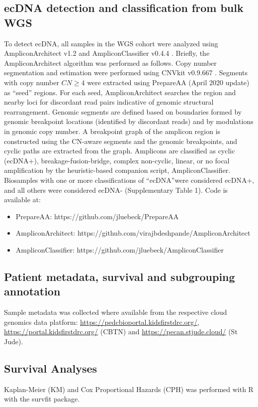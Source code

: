 \subsection{ecDNA detection and classification from bulk WGS}
\label{4-classification}
To detect ecDNA, all samples in the WGS cohort were analyzed using AmpliconArchitect v1.2 \cite{AA} and AmpliconClassifier v0.4.4 \cite{Kim_2020}. Briefly, the AmpliconArchitect algorithm was performed as follows. Copy number segmentation and estimation were performed using CNVkit v0.9.667 \cite{cnvkit}. Segments with copy number $ CN \geq 4$ were extracted using PrepareAA (April 2020 update) as “seed” regions. For each seed, AmpliconArchitect searches the region and nearby loci for discordant read pairs indicative of genomic structural rearrangement. Genomic segments are defined based on boundaries formed by genomic breakpoint locations (identified by discordant reads) and by modulations in genomic copy number. A breakpoint graph of the amplicon region is constructed using the CN-aware segments and the genomic breakpoints, and cyclic paths are extracted from the graph.  Amplicons are classified as cyclic (ecDNA+), breakage-fusion-bridge, complex non-cyclic, linear, or no focal amplification by the heuristic-based companion script, AmpliconClassifier. Biosamples with one or more classifications of ``ecDNA''were considered ecDNA+, and all others were considered ecDNA- (Supplementary Table 1). 
Code is available at:
\begin{itemize}
\item PrepareAA: https://github.com/jluebeck/PrepareAA 
\item AmpliconArchitect: https://github.com/virajbdeshpande/AmpliconArchitect 
\item AmpliconClassifier: https://github.com/jluebeck/AmpliconClassifier 
\end{itemize}

\subsection{Patient metadata, survival and subgrouping annotation}

Sample metadata was collected where available from the respective cloud genomics data platform: \url{https://pedcbioportal.kidsfirstdrc.org/}, \url{https://portal.kidsfirstdrc.org/} (CBTN) and \url{https://pecan.stjude.cloud/} (St Jude).

\subsection{Survival Analyses}
Kaplan-Meier (KM) and Cox Proportional Hazards (CPH) was performed with R with the survfit package. 

